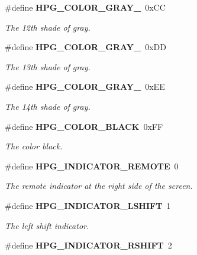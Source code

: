 \begin{CompactItemize}
\#define {\bf HPG\_\-COLOR\_\-GRAY\_}\ 0x\-CC
\begin{CompactList}\small\item\em The 12th shade of gray.\item\end{CompactList}\item 
\#define {\bf HPG\_\-COLOR\_\-GRAY\_}\ 0x\-DD
\begin{CompactList}\small\item\em The 13th shade of gray.\item\end{CompactList}\item 
\#define {\bf HPG\_\-COLOR\_\-GRAY\_}\ 0x\-EE
\begin{CompactList}\small\item\em The 14th shade of gray.\item\end{CompactList}\item 
\#define {\bf HPG\_\-COLOR\_\-BLACK}\ 0x\-FF
\begin{CompactList}\small\item\em The color black.\item\end{CompactList}\item 
{}
\#define {\bf HPG\_\-INDICATOR\_\-REMOTE}\ 0\label{hpgraphics_8h_a18}

\begin{CompactList}\small\item\em The remote indicator at the right side of the screen.\item\end{CompactList}\item 
{}
\#define {\bf HPG\_\-INDICATOR\_\-LSHIFT}\ 1\label{hpgraphics_8h_a19}

\begin{CompactList}\small\item\em The left shift indicator.\item\end{CompactList}\item 
{}
\#define {\bf HPG\_\-INDICATOR\_\-RSHIFT}\ 2\label{hpgraphics_8h_a20}


\end{CompactItemize}
